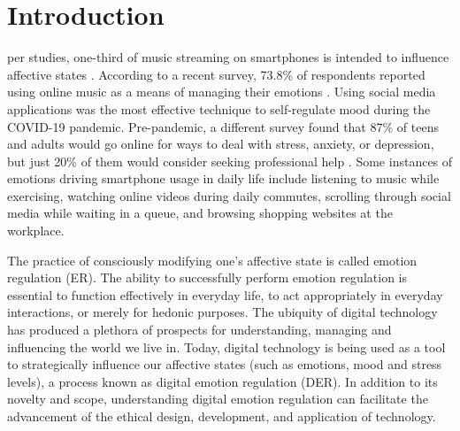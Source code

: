 \documentclass[lettersize,journal]{IEEEtran}
\begin{document}
\section{Introduction}
 per studies, one-third of music streaming on smartphones is intended to influence affective states \cite{wadley2019use}. According to a recent survey, 73.8\% of respondents reported using online music as a means of managing their emotions \cite{martin2021music}. Using social media applications was the most effective technique to self-regulate mood during the COVID-19 pandemic. Pre-pandemic, a different survey found that 87\% of teens and adults would go online for ways to deal with stress, anxiety, or depression, but just 20\% of them would consider seeking professional help \cite{rideout2018digital}. Some instances of emotions driving smartphone usage in daily life include listening to music while exercising, watching online videos during daily commutes, scrolling through social media while waiting in a queue, and browsing shopping websites at the workplace.


The practice of consciously modifying one's affective state is called emotion regulation (ER). The ability to successfully perform emotion regulation is essential to function effectively in everyday life, to act appropriately in everyday interactions, or merely for hedonic purposes. The ubiquity of digital technology has produced a plethora of prospects for understanding, managing and influencing the world we live in. Today, digital technology is being used as a tool to strategically influence our affective states (such as emotions, mood and stress levels), a process known as digital emotion regulation (DER). In addition to its novelty and scope, understanding digital emotion regulation can facilitate the advancement of the ethical design, development, and application of technology.
\end{document}
